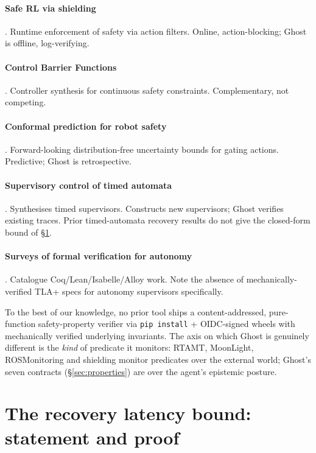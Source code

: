 \documentclass[11pt,a4paper]{article}
\begin{document}
\paragraph{Safe RL via shielding} \cite{shielding2020}.
Runtime enforcement of safety via action filters. Online,
action-blocking; Ghost is offline, log-verifying.

\paragraph{Control Barrier Functions} \cite{cbf2023}.
Controller synthesis for continuous safety constraints.
Complementary, not competing.

\paragraph{Conformal prediction for robot safety}
\cite{lindemann2023}.
Forward-looking distribution-free uncertainty bounds for gating
actions. Predictive; Ghost is retrospective.

\paragraph{Supervisory control of timed automata}
\cite{timedaut2022}.
Synthesises timed supervisors. Constructs new supervisors; Ghost
verifies existing traces. Prior timed-automata recovery results
do not give the closed-form bound of \S\ref{app:theorem}.

\paragraph{Surveys of formal verification for autonomy}
\cite{rizaldi2020}.
Catalogue Coq/Lean/Isabelle/Alloy work. Note the absence of
mechanically-verified TLA+ specs for autonomy supervisors
specifically.

To the best of our knowledge, no prior tool ships a
content-addressed, pure-function safety-property verifier via
\texttt{pip install} + OIDC-signed wheels with mechanically
verified underlying invariants. The axis on which Ghost is
genuinely different is the \emph{kind} of predicate it monitors:
RTAMT, MoonLight, ROSMonitoring and shielding monitor predicates
over the external world; Ghost's seven contracts
(\S\ref{sec:properties}) are over the agent's epistemic posture.

\section{The recovery latency bound: statement and proof}
\label{app:theorem}
\end{document}
